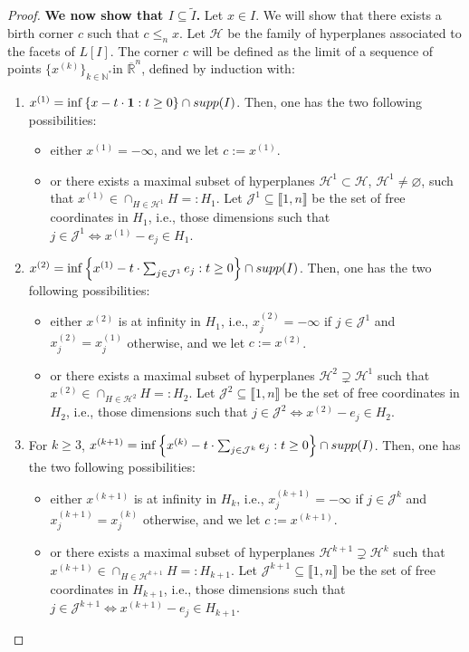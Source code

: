 \documentclass{article}
\newcommand{\R}{\mathbb{R}}
\newcommand{\leqn}{\leq_n}
\newcommand{\lowerb}[1]{ L[#1] }
\newcommand{\supp}[1]{ {\rm supp}(#1) }
\begin{document}
\begin{proof}
		\textbf{We now show that $ {I} \subseteq {\tilde I}$.} %
		Let $x \in {I}$. We will show that there exists a birth corner $c$ such that $c \leqn x$.
		Let $\mathcal H$ be the family of hyperplanes associated to the facets of $\lowerb{I}$. %
		The corner $c$ will be defined as the limit of a sequence of points $\{x^{(k)}\}_{k\in\mathbb{N}^*}$in $ \overline{\R}^n$, defined by induction with:
		\begin{enumerate}
			\item $x^{(1)} = \inf \left\{ x - t\cdot \mathbf{1} : t\ge 0\right\} \cap \supp{I}$. Then, one has the two following possibilities:
				\begin{itemize}
					\item either $x^{(1)} = -\boldsymbol \infty$,
						and
						we let $c:= x^{(1)}$.
					\item or there exists a maximal subset of hyperplanes $\mathcal H^1 \subset \mathcal H$, $\mathcal H^1 \neq \varnothing$,
						such that $x^{(1)} \in \cap_{H \in \mathcal H^1}H=:H_1$.
						Let $\mathcal  J^1 \subseteq \llbracket 1,n \rrbracket$ be the set of free coordinates in $H_1$, i.e., those dimensions such that $j\in \mathcal J^1 \Longleftrightarrow x^{(1)}- e_j \in H_1$.
				\end{itemize}
			\item $x^{(2)} = \inf \left\{ x^{(1)} - t \cdot \sum_{j\in \mathcal J^1}e_j %
				: t\ge 0\right\} \cap \supp{I}$. %
				Then,  one has the two following possibilities:
				\begin{itemize}
					\item either $x^{(2)}$ is at infinity in $H_1$, i.e., $x^{(2)}_j = -\infty$ if $j \in \mathcal J^1$ and $x^{(2)}_j = x^{(1)}_j$ otherwise, and we let $c:=x^{(2)}$.
					\item or there exists a maximal subset of hyperplanes $\mathcal H^2\supsetneq \mathcal H^1$ %
						such that $x^{(2)} \in \cap_{H \in \mathcal H^2}H=:H_2$. %
						Let $\mathcal J^2 \subseteq \llbracket 1,n \rrbracket$ be the set of free coordinates in $H_2$, i.e., those dimensions such that $j\in \mathcal J^2 \Longleftrightarrow x^{(2)}- e_j \in H_2$.
				\end{itemize}
			\item For $k\ge 3$,  $x^{(k+1)} = \inf \left\{ x^{(k)} - t \cdot \sum_{j\in \mathcal J^k}e_j : t\ge 0\right\}\cap \supp{I}$. %
				Then,  one has the two following possibilities:
				\begin{itemize}
					\item either $x^{(k+1)}$ is at infinity in $H_k$, i.e., $x^{(k+1)}_j = -\infty$ if $j \in \mathcal J^k$ and $x^{(k+1)}_j = x^{(k)}_j$ otherwise, and we let $c:=x^{(k+1)}$. %
					\item or there exists a maximal subset of hyperplanes $\mathcal H^{k+1}\supsetneq \mathcal H^k$ %
						such that $x^{(k+1)} \in \cap_{H \in \mathcal H^{k+1}}H=:H_{k+1}$. %
						Let $\mathcal J^{k+1} \subseteq \llbracket 1,n \rrbracket$ be the set of
						free coordinates in $H_{k+1}$, i.e., those dimensions such that $j\in \mathcal J^{k+1} \Longleftrightarrow x^{(k+1)}- e_j \in H_{k+1}$.
				\end{itemize}
		\end{enumerate}


\end{proof}
\end{document}
